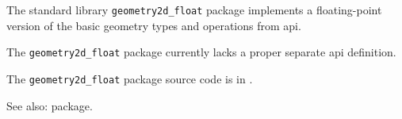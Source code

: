 
The standard library {\tt geometry2d\_float} package implements a floating-point version of the basic geometry types and operations from  api.

The {\tt geometry2d\_float} package currently lacks a proper separate api definition.

The {\tt geometry2d\_float} package source code is in .

See also:   package.
